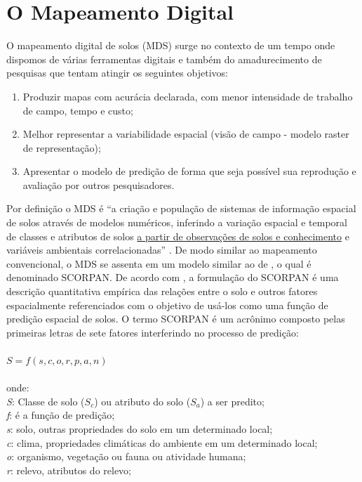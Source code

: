 \section{O Mapeamento Digital}
O mapeamento digital de solos (MDS) surge  no  contexto  de  um  tempo onde dispomos de várias ferramentas digitais e também do amadurecimento de pesquisas que tentam atingir os seguintes objetivos:
\begin{enumerate}
\item Produzir mapas com acurácia declarada, com menor intensidade de trabalho de campo, tempo e custo;
\item Melhor representar a variabilidade espacial (visão de campo - modelo raster de representação);
\item Apresentar o modelo de predição de forma que seja possível sua reprodução e avaliação por outros pesquisadores.
\end{enumerate}
Por definição o MDS é ``a criação e população de sistemas de informação espacial de solos através de modelos numéricos, inferindo a variação espacial e temporal de classes e atributos de solos \underline{a partir de observações de solos e conhecimento} e variáveis ambientais correlacionadas'' \citep{McBratneyEtAl:2003}. De modo similar ao mapeamento convencional, o MDS se assenta em um modelo similar ao de \cite{Jenny:1941}, o qual é denominado SCORPAN. De acordo com \cite{McBratneyEtAl:2003}, a formulação do SCORPAN é uma descrição quantitativa empírica das relações entre o solo e outros fatores espacialmente referenciados com o objetivo de usá-los como uma função de predição espacial de solos. O termo SCORPAN é um acrônimo composto pelas primeiras letras de sete fatores interferindo no processo de predição:\\
\\
$S=f(s, c, o, r, p, a, n)$\\
\\
onde:\\
\emph{S}: Classe de solo ($S_c$) ou atributo do solo ($S_a$) a ser predito;\\
\emph{f}: é a função de predição;\\
\emph{s}: solo, outras propriedades do solo em um determinado local;\\
\emph{c}: clima, propriedades climáticas do ambiente em um determinado local;\\
\emph{o}: organismo, vegetação ou fauna ou atividade humana;\\
\emph{r}: relevo, atributos do relevo;\\
